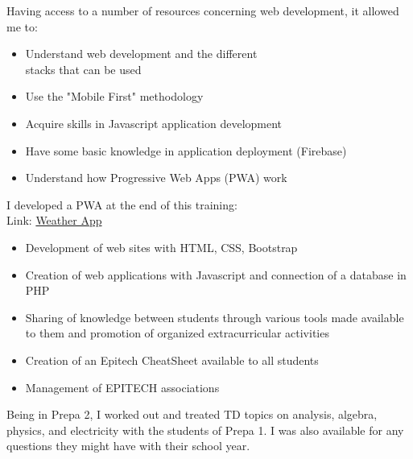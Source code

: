 \documentclass[10pt,a4paper,ragged2e,withhyper]{altacv}
\begin{document}
\begin{paracol}{2}
Having access to a number of resources concerning web development, it allowed me to:\\
\begin{itemize}
\item Understand web development and the different\\
stacks that can be used
\item Use the "Mobile First" methodology
\item Acquire skills in Javascript application development
\item Have some basic knowledge in application deployment (Firebase)
\item Understand how Progressive Web Apps (PWA) work\\
\end{itemize}
I developed a PWA at the end of this training:\\
Link:
\href{https://tinyurl.com/app-weather}{Weather App}\\
\divider

\begin{itemize}
\item Development of web sites with HTML, CSS, Bootstrap
\item Creation of web applications with Javascript and connection of a database in PHP
\end{itemize}

\newpage
\switchcolumn


\begin{itemize}
\item Sharing of knowledge between students through various tools made available to them and promotion of organized extracurricular activities
\item Creation of an Epitech CheatSheet available to all students
\item Management of EPITECH associations
\end{itemize}

\divider

Being in Prepa 2, I worked out and treated TD topics on analysis, algebra, physics, and electricity with the students of Prepa 1. I was also available for any questions they might have with their school year.\\


\end{paracol}
\end{document}
